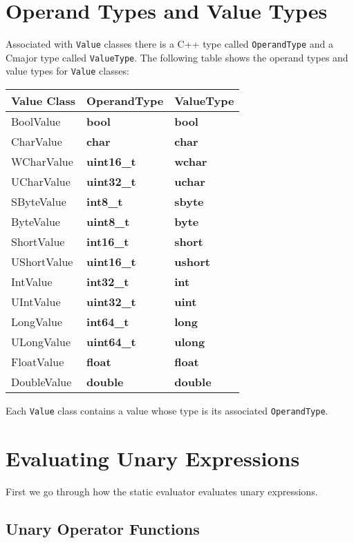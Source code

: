 \documentclass[a4paper,oneside,11pt]{book}
\theoremstyle{definition}
\begin{document}
\section{Operand Types and Value Types}

Associated with \verb|Value| classes there is a C++ type called \verb|OperandType| and a Cmajor type called \verb|ValueType|.
The following table shows the operand types and value types for \verb|Value| classes:

\begin{flushleft}
\begin{supertabular}{lll}
\textbf{Value Class}& \textbf{OperandType}& \textbf{ValueType}\\
\hline
BoolValue& \textbf{bool}& \textbf{bool}\\
CharValue& \textbf{char}& \textbf{char}\\
WCharValue& \textbf{uint16_t}& \textbf{wchar}\\
UCharValue& \textbf{uint32_t}& \textbf{uchar}\\
SByteValue& \textbf{int8_t}& \textbf{sbyte}\\
ByteValue& \textbf{uint8_t}& \textbf{byte}\\
ShortValue& \textbf{int16_t}& \textbf{short}\\
UShortValue& \textbf{uint16_t}& \textbf{ushort}\\
IntValue& \textbf{int32_t}& \textbf{int}\\
UIntValue& \textbf{uint32_t}& \textbf{uint}\\
LongValue& \textbf{int64_t}& \textbf{long}\\
ULongValue& \textbf{uint64_t}& \textbf{ulong}\\
FloatValue& \textbf{float}& \textbf{float}\\
DoubleValue& \textbf{double}& \textbf{double}\\
\hline
\end{supertabular}
\end{flushleft}

Each \verb|Value| class contains a value whose type is its associated \verb|OperandType|.

\section{Evaluating Unary Expressions}

First we go through how the static evaluator evaluates unary expressions.

\subsection{Unary Operator Functions}
\end{document}
